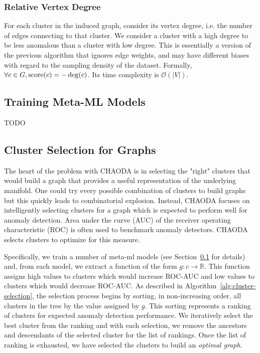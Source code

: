 \subsubsection{Relative Vertex Degree}
\label{subsubsec:methods:individual-algorithms:relative-vertex-degree}
For each cluster in the induced graph, consider its vertex degree, i.e. the number of edges connecting to that cluster.
We consider a cluster with a high degree to be less anomalous than a cluster with low degree.
This is essentially a version of the previous algorithm that ignores edge weights, and may have different biases with regard to the sampling density of the dataset.
Formally, $\forall c \in G, \operatorname{score}(c) = -\deg(c)$.
Its time complexity is $\mathcal{O}(|V|)$.


\subsection{Training Meta-ML Models}
\label{subsec:methods:training-meta-ml-models}
TODO


\subsection{Cluster Selection for Graphs}
\label{subsec:methods:cluster-selection-for-graphs}

The heart of the problem with CHAODA is in selecting the "right" clusters that would build a graph that provides a useful representation of the underlying manifold.
One could try every possible combination of clusters to build graphs but this quickly leads to combinatorial explosion.
Instead, CHAODA focuses on intelligently selecting clusters for a graph which is expected to perform well for anomaly detection.
Area under the curve (AUC) of the receiver operating characteristic (ROC) is often used to benchmark anomaly detectors.
CHAODA selects clusters to optimize for this measure.

Specifically, we train a number of meta-ml models (see Section~\ref{subsec:methods:training-meta-ml-models} for details) and, from each model, we extract a function of the form $g : c \rightarrow \mathbb{R}$.
This function assigns high values to clusters which would increase ROC-AUC and low values to clusters which would decrease ROC-AUC.
As described in Algorithm~\ref{alg:cluster-selection}, the selection process begins by sorting, in non-increasing order, all clusters in the tree by the value assigned by $g$.
This sorting represents a ranking of clusters for expected anomaly detection performance.
We iteratively select the best cluster from the ranking and with each selection, we remove the ancestors and descendants of the selected cluster for the list of rankings.
Once the list of ranking is exhausted, we have selected the clusters to build an \textit{optimal graph}.

